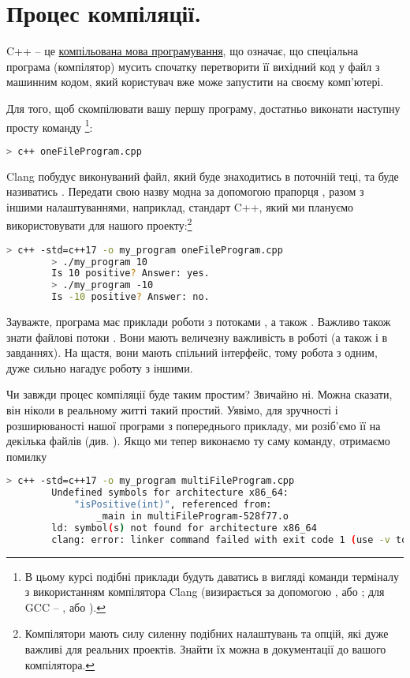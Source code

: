 \documentclass[12pt]{article}
\begin{document}
	\section{Процес компіляції.}

	C++ -- це \href{https://uk.wikipedia.org/wiki/%D0%9A%D0%BE%D0%BC%D0%BF%D1%96%D0%BB%D1%8C%D0%BE%D0%B2%D0%B0%D0%BD%D0%B0_%D0%BC%D0%BE%D0%B2%D0%B0_%D0%BF%D1%80%D0%BE%D0%B3%D1%80%D0%B0%D0%BC%D1%83%D0%B2%D0%B0%D0%BD%D0%BD%D1%8F}{компільована мова програмування}, що означає, що спеціальна програма (компілятор) мусить спочатку перетворити її вихідний код у файл з машинним кодом, який користувач вже може запустити на своєму комп'ютері. 

	Для того, щоб скомпілювати вашу першу програму, достатньо виконати наступну просту команду \footnote{В цьому курсі подібні приклади будуть даватись в вигляді команди терміналу з використанням компілятора Clang (визирається за допомогою , або ; для GCC --  , або ).}:
	\begin{lstlisting}[language=bash]
		> c++ oneFileProgram.cpp
	\end{lstlisting}

	Clang побудує виконуваний файл, який буде знаходитись в поточній теці, та буде називатись . Передати свою назву модна за допомогою прапорця , разом з іншими налаштуваннями, наприклад, стандарт C++, який ми плануємо використовувати для нашого проекту:\footnote{Компілятори мають силу силенну подібних налаштувань та опцій, які дуже важливі для реальних проектів. Знайти їх можна в документації до вашого компілятора.}
	\begin{lstlisting}[language=bash]
		> c++ -std=c++17 -o my_program oneFileProgram.cpp
		> ./my_program 10
		Is 10 positive? Answer: yes.
		> ./my_program -10
		Is -10 positive? Answer: no.
	\end{lstlisting}

	Зауважте, програма  має приклади роботи з потоками , а також . Важливо також знати файлові потоки . Вони мають величезну важливість в роботі (а також і в завданнях). На щастя, вони мають спільний інтерфейс, тому робота з одним, дуже сильно нагадує роботу з іншими.

	Чи завжди процес компіляції буде таким простим? Звичайно ні. Можна сказати, він ніколи в реальному житті такий простий. Уявімо, для зручності і розширюваності нашої програми з попереднього прикладу, ми розіб'ємо її на декілька файлів (див. ).
	Якщо ми тепер виконаємо ту саму команду, отримаємо помилку
	\begin{lstlisting}[language=bash]
		> c++ -std=c++17 -o my_program multiFileProgram.cpp
		Undefined symbols for architecture x86_64:
			"isPositive(int)", referenced from:
				_main in multiFileProgram-528f77.o
		ld: symbol(s) not found for architecture x86_64
		clang: error: linker command failed with exit code 1 (use -v to see invocation)
	\end{lstlisting}
\end{document}
